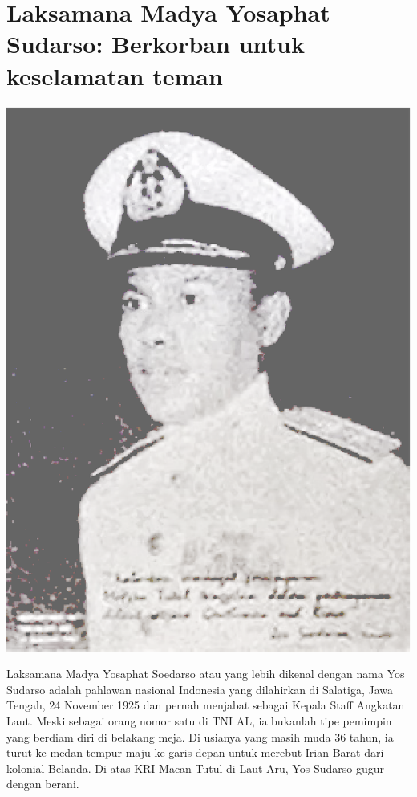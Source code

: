 \section*{Laksamana Madya Yosaphat Sudarso: Berkorban untuk keselamatan teman} 

\begin{floatingfigure}[r]{2cm}
\begin{center}
\includegraphics[scale=0.175]{Yos-Sudarso.ps}
\end{center}
\end{floatingfigure}
Laksamana Madya Yosaphat Soedarso atau yang lebih dikenal dengan nama Yos  Sudarso adalah pahlawan nasional Indonesia yang dilahirkan di Salatiga, Jawa  Tengah, 24 November 1925 dan pernah menjabat sebagai Kepala Staff Angkatan Laut.  Meski sebagai orang nomor satu di TNI AL, ia bukanlah tipe pemimpin yang berdiam diri di belakang meja.  Di usianya yang masih muda 36 tahun, ia turut ke medan tempur maju ke garis depan untuk merebut Irian Barat dari kolonial Belanda. Di atas KRI Macan Tutul di Laut Aru, Yos Sudarso gugur dengan berani.

